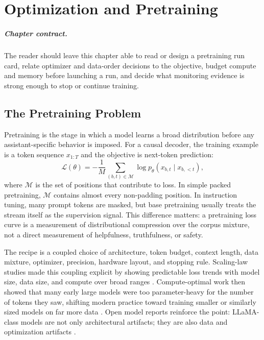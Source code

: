 \chapter{Optimization and Pretraining}
\label{ch:optimization-pretraining}


\paragraph{Chapter contract.} The reader should leave this chapter able to read or design a pretraining run card, relate optimizer and data-order decisions to the objective, budget compute and memory before launching a run, and decide what monitoring evidence is strong enough to stop or continue training.

\section{The Pretraining Problem}
\label{sec:pretraining-problem}

Pretraining is the stage in which a model learns a broad distribution before any assistant-specific behavior is imposed. For a causal decoder, the training example is a token sequence $x_{1:T}$ and the objective is next-token prediction:
\begin{equation}
  \mathcal{L}(\theta)
  =
  -\frac{1}{M}
  \sum_{(b,t)\in \mathcal{M}}
  \log p_{\theta}(x_{b,t} \mid x_{b,<t}),
\end{equation}
where $\mathcal{M}$ is the set of positions that contribute to loss. In simple packed pretraining, $\mathcal{M}$ contains almost every non-padding position. In instruction tuning, many prompt tokens are masked, but base pretraining usually treats the stream itself as the supervision signal. This difference matters: a pretraining loss curve is a measurement of distributional compression over the corpus mixture, not a direct measurement of helpfulness, truthfulness, or safety.

The recipe is a coupled choice of architecture, token budget, context length, data mixture, optimizer, precision, hardware layout, and stopping rule. Scaling-law studies made this coupling explicit by showing predictable loss trends with model size, data size, and compute over broad ranges \cite{kaplan2020scaling}. Compute-optimal work then showed that many early large models were too parameter-heavy for the number of tokens they saw, shifting modern practice toward training smaller or similarly sized models on far more data \cite{hoffmann2022training}. Open model reports reinforce the point: LLaMA-class models are not only architectural artifacts; they are also data and optimization artifacts \cite{touvron2023llama,touvron2023llama2,dubey2024llama3}.

